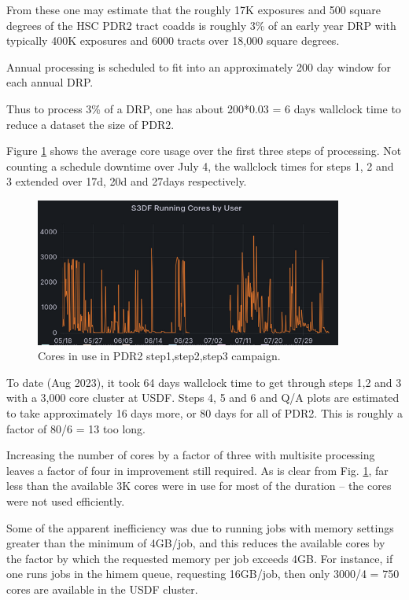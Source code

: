 From these one may estimate that the roughly 17K exposures and 500 
square degrees of the HSC PDR2 tract coadds is roughly 3\% of an 
early year DRP with typically 400K exposures and 6000 tracts 
over 18,000 square degrees.

Annual processing is scheduled to fit into an approximately 200 day window
for each annual DRP.

Thus to process 3\% of a DRP, one has about 200*0.03 = 6 days wallclock time
to reduce a dataset the size of PDR2.

Figure \ref{fig:cores} shows the average core usage over the first
three steps of processing.  Not counting a schedule downtime 
over July 4, the wallclock times for steps 1, 2 and 3 extended over
17d, 20d and 27days respectively.

\begin{figure}
\includegraphics[width=0.9\textwidth]{Campcorespdr2.png}
\caption{Cores in use in PDR2 step1,step2,step3 campaign.}  \label{fig:cores}
\end{figure}

To date (Aug 2023), it took 64 days wallclock time to get through 
steps 1,2 and 3 with a 3,000 core cluster at USDF.  
Steps 4, 5 and 6 and Q/A plots are estimated to take approximately 
16 days more, or 80 days for all of PDR2.   This is roughly a 
factor of 80/6 = 13 too long.

Increasing the number of cores by a factor of three with multisite processing
leaves a factor of four in improvement still required.
As is clear from Fig. \ref{fig:cores}, far less than the available 3K cores
were in use for most of the duration -- the cores were not used
efficiently.

Some of the apparent inefficiency was due to running jobs with memory
settings greater than the minimum of 4GB/job, and this reduces the available
cores by the factor by which the requested memory per job exceeds 4GB.
For instance, if one runs jobs in the himem queue, requesting 16GB/job,
then only 3000/4 = 750 cores are available in the USDF cluster.


